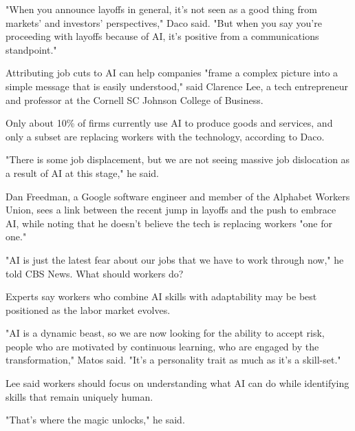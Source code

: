 "When you announce layoffs in general, it's not seen as a good thing from markets' and investors' perspectives," Daco said. "But when you say you're proceeding with layoffs because of AI, it's positive from a communications standpoint."

Attributing job cuts to AI can help companies "frame a complex picture into a simple message that is easily understood," said Clarence Lee, a tech entrepreneur and professor at the Cornell SC Johnson College of Business.

Only about 10\% of firms currently use AI to produce goods and services, and only a subset are replacing workers with the technology, according to Daco.

"There is some job displacement, but we are not seeing massive job dislocation as a result of AI at this stage," he said.

Dan Freedman, a Google software engineer and member of the Alphabet Workers Union, sees a link between the recent jump in layoffs and the push to embrace AI, while noting that he doesn't believe the tech is replacing workers "one for one."

"AI is just the latest fear about our jobs that we have to work through now," he told CBS News.
What should workers do?

Experts say workers who combine AI skills with adaptability may be best positioned as the labor market evolves.

"AI is a dynamic beast, so we are now looking for the ability to accept risk, people who are motivated by continuous learning, who are engaged by the transformation," Matos said. "It's a personality trait as much as it's a skill-set."

Lee said workers should focus on understanding what AI can do while identifying skills that remain uniquely human.

"That's where the magic unlocks," he said.
